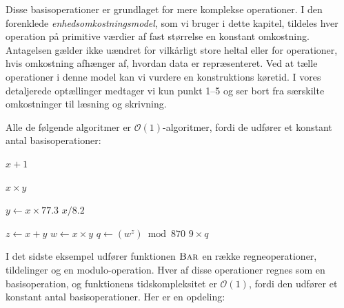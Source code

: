 Disse basisoperationer er grundlaget for mere komplekse operationer. I den forenklede \emph{enhedsomkostningsmodel}, som vi bruger i dette kapitel, tildeles hver operation på primitive værdier af fast størrelse en konstant omkostning. Antagelsen gælder ikke uændret for vilkårligt store heltal eller for operationer, hvis omkostning afhænger af, hvordan data er repræsenteret. Ved at tælle operationer i denne model kan vi vurdere en konstruktions køretid. I vores detaljerede optællinger medtager vi kun punkt 1--5 og ser bort fra særskilte omkostninger til læsning og skrivning.

Alle de følgende algoritmer er $\mathcal{O}(1)$-algoritmer, fordi de udfører et konstant antal basisoperationer:

\begin{codebox}
    \li \Return $x + 1$
\end{codebox}

\begin{codebox}
    \li \Return $x \times y$
\end{codebox}

\begin{codebox}
    \li $y \gets x \times 77.3$
    \li \Return $x / 8.2$
\end{codebox}

\begin{codebox}
    \li $z \gets x + y$
    \li $w \gets x \times y$
    \li $q \gets (w^z) \bmod 870$
    \li \Return $9 \times q$
\end{codebox}

I det sidste eksempel udfører funktionen $\proc{Bar}$ en række regneoperationer, tildelinger og en modulo-operation. Hver af disse operationer regnes som en basisoperation, og funktionens tidskompleksitet er $\mathcal{O}(1)$, fordi den udfører et konstant antal basisoperationer. Her er en opdeling:

